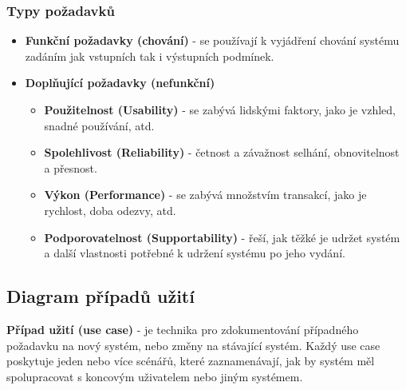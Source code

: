 \subsubsection{Typy požadavků}
\begin{itemize}
\item \textbf{Funkční požadavky (chování)} - se používají k vyjádření chování systému zadáním jak vstupních tak i výstupních podmínek.
\item \textbf{Doplňující požadavky (nefunkční)}
\begin{itemize}
\item \textbf{Použitelnost (Usability)} - se zabývá lidskými faktory, jako je vzhled, snadné používání, atd.
\item \textbf{Spolehlivost (Reliability)} -  četnost a závažnost selhání, obnovitelnost a přesnost.
\item \textbf{Výkon (Performance)} - se zabývá množstvím transakcí, jako je rychlost, doba odezvy, atd.
\item \textbf{Podporovatelnost (Supportability)} - řeší, jak těžké je udržet systém a další vlastnosti potřebné k udržení systému po jeho vydání.
\end{itemize}
\end{itemize}

\subsection{Diagram případů užití}
\textbf{Případ užití (use case)} - je technika pro zdokumentování případného požadavku na nový systém, nebo změny na stávající systém. Každý use case poskytuje jeden nebo více scénářů, které zaznamenávají, jak by systém měl spolupracovat s koncovým uživatelem nebo jiným systémem.

